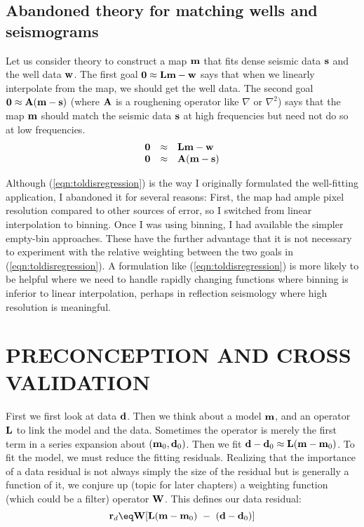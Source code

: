 \subsection{Abandoned theory for matching wells and seismograms}
\par
Let us consider theory to
construct a map $\bold m$ that fits dense seismic data
$\bold s$ and the well data $\bold w$.
The first goal
$\bold 0 \approx  \bold L \bold m - \bold w$
says that when we linearly interpolate from the map,
we should get the well data.
The second goal
$\bold 0 \approx \bold A (\bold m - \bold s)$
(where $\bold A$ is a roughening operator like $\nabla$ or $\nabla^2$)
says that the map $\bold m$ should match the seismic data $\bold s$
at high frequencies but need not do so at low frequencies.
\begin{equation}
        \begin{array}{lll}
        \bold 0 &\approx & \bold L \bold m - \bold w \\
        \bold 0 &\approx & \bold A (\bold m - \bold s)
        \label{eqn:toldisregression}
        \end{array}
\end{equation}
\par
Although (\ref{eqn:toldisregression}) is the way I originally formulated
the well-fitting application, I abandoned it for several reasons:
First, the map had ample pixel resolution compared to other sources of error,
so I switched from linear interpolation to binning.
Once I was using binning,
I had available the simpler empty-bin approaches.
These have the further advantage that it is not necessary
to experiment with the relative weighting between
the two goals in (\ref{eqn:toldisregression}).
A formulation like (\ref{eqn:toldisregression}) is more likely
to be helpful where we need to handle rapidly changing functions
where binning is inferior to linear interpolation,
perhaps in reflection seismology where high resolution is meaningful.

\section{PRECONCEPTION AND CROSS VALIDATION}

First we first look at data $\bold d$.
Then we think about a model $\bold m$,
and an operator $\bold L$ to link the model and the data.
Sometimes the operator is merely the first term in a series expansion
about $(\bold m_0,\bold d_0)$.
Then we fit
$\bold d-\bold d_0 \approx \bold L ( \bold m-\bold m_0)$.
To fit the model, we must reduce the fitting residuals.
Realizing that the importance of a data residual
is not always simply the size of the residual
but is generally a function of it,
we conjure up (topic for later chapters)
a weighting function (which could be a filter) operator $\bold W$.
This defines our data residual:
\begin{equation}
\bold r_d \eq \bold W
[ \bold L
        ( \bold m-\bold m_0)
\ -\ 
        ( \bold d-\bold d_0)
]
\end{equation}

